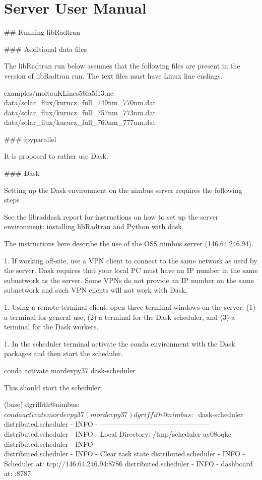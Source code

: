 

\chapter{Server User Manual}
\label{chap:ServerUserManual}


## Running libRadtran

### Additional data files
 
The libRadtran run below assumes that the following files are present in the version of libRadtran run. The text files must have Linux line endings.

    examples/moltauKLines56fa5f13.nc
    data/solar_flux/kurucz_full_749nm_770nm.dat
    data/solar_flux/kurucz_full_757nm_773nm.dat
    data/solar_flux/kurucz_full_760nm_777nm.dat

### ipyparallel

It is proposed to rather use Dask.

### Dask

Setting up the Dask environment on the nimbus server requires the following steps

See the libraddask report for instructions on how to set up the server environment: installing libRadtran and Python with dask.

The instructions here describe the use of the OSS nimbus server (146.64.246.94).

1. If working off-site, use a VPN client to connect to the same network as used by the server.  Dask requires that your local PC must have an IP number in the same subnetwork as the server.  Some VPNs do not provide an IP number on the same subnetwork and such VPN clients will not work with Dask.

1. Using a remote terminal client, open three terminal windows on the server: (1) a  terminal for general use, (2) a terminal for the Dask scheduler, and (3) a terminal for the Dask workers.

1. In the scheduler terminal activate the conda environment with the Dask packages and then start the scheduler.

        conda activate mordevpy37
        dask-scheduler
        
   This should start the scheduler:
   
        (base) dgriffith@nimbus:~$ conda activate mordevpy37
        (mordevpy37) dgriffith@nimbus:~$ dask-scheduler
        distributed.scheduler - INFO - -----------------------------------------------
        distributed.scheduler - INFO - Local Directory:    /tmp/scheduler-ay08oqkc
        distributed.scheduler - INFO - -----------------------------------------------
        distributed.scheduler - INFO - Clear task state
        distributed.scheduler - INFO -   Scheduler at:  tcp://146.64.246.94:8786
        distributed.scheduler - INFO -   dashboard at:                     :8787

